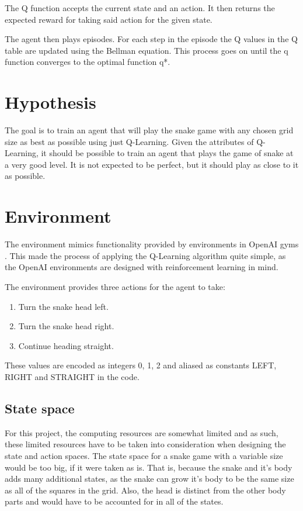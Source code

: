 \documentclass[lettersize,journal]{IEEEtran}
\begin{document}
The Q function accepts the current state and an action. It then
returns the expected reward for taking said action for the given
state.

The agent then plays episodes. For each step in the episode
the Q values in the Q table are updated using the Bellman
equation. This process goes on until the q function converges
to the optimal function q*.

\section{Hypothesis}
The goal is to train an agent that will play the snake game
with any chosen grid size as best as possible using just Q-Learning.
Given the attributes of Q-Learning, it should be possible to train
an agent that plays the game of snake at a very good level. It
is not expected to be perfect, but it should play as close to it
as possible.

\section{Environment}
The environment mimics functionality provided by environments in
OpenAI gyms \cite{openai}. This made the process of applying the Q-Learning
algorithm quite simple, as the OpenAI environments are designed
with reinforcement learning in mind.

The environment provides three actions for the agent to take:
\begin{enumerate}
    \item Turn the snake head left.
    \item Turn the snake head right.
    \item Continue heading straight.
\end{enumerate}
These values are encoded as integers 0, 1, 2 and aliased as
constants LEFT, RIGHT and STRAIGHT in the code.


\subsection{State space}
For this project, the computing resources are somewhat limited and
as such, these limited resources have to be taken into consideration
when designing the state and action spaces.
The state space for a snake game with a variable size would be
too big, if it were taken as is. That is, because the snake and
it's body adds many additional states, as the snake can grow it's body to
be the same size as all of the squares in the grid. Also, the head is distinct
from the other body parts and would have to be accounted for in all of the states.
\end{document}
